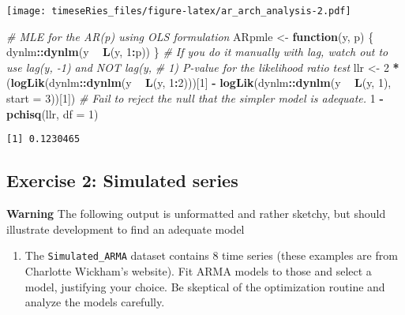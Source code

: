 \documentclass[]{book}
\newenvironment{Shaded}{\begin{snugshade}}{\end{snugshade}}
\newcommand{\CommentTok}[1]{\textcolor[rgb]{0.56,0.35,0.01}{\textit{#1}}}
\newcommand{\ControlFlowTok}[1]{\textcolor[rgb]{0.13,0.29,0.53}{\textbf{#1}}}
\newcommand{\DataTypeTok}[1]{\textcolor[rgb]{0.13,0.29,0.53}{#1}}
\newcommand{\DecValTok}[1]{\textcolor[rgb]{0.00,0.00,0.81}{#1}}
\newcommand{\KeywordTok}[1]{\textcolor[rgb]{0.13,0.29,0.53}{\textbf{#1}}}
\newcommand{\NormalTok}[1]{#1}
\newcommand{\OperatorTok}[1]{\textcolor[rgb]{0.81,0.36,0.00}{\textbf{#1}}}
\newcommand{\StringTok}[1]{\textcolor[rgb]{0.31,0.60,0.02}{#1}}
\providecommand{\tightlist}{%
  \setlength{\itemsep}{0pt}\setlength{\parskip}{0pt}}
\begin{document}
\texttt{[image: timeseRies\_files/figure-latex/ar\_arch\_analysis-2.pdf]}

\begin{Shaded}
\begin{Highlighting}[]
\CommentTok{# MLE for the AR(p) using OLS formulation}
\NormalTok{ARpmle <-}\StringTok{ }\ControlFlowTok{function}\NormalTok{(y, p) \{}
\NormalTok{    dynlm}\OperatorTok{::}\KeywordTok{dynlm}\NormalTok{(y }\OperatorTok{~}\StringTok{ }\KeywordTok{L}\NormalTok{(y, }\DecValTok{1}\OperatorTok{:}\NormalTok{p))}
\NormalTok{\}}
\CommentTok{# If you do it manually with lag, watch out to use lag(y, -1) and NOT lag(y,}
\CommentTok{# 1) P-value for the likelihood ratio test}
\NormalTok{llr <-}\StringTok{ }\DecValTok{2} \OperatorTok{*}\StringTok{ }\NormalTok{(}\KeywordTok{logLik}\NormalTok{(dynlm}\OperatorTok{::}\KeywordTok{dynlm}\NormalTok{(y }\OperatorTok{~}\StringTok{ }\KeywordTok{L}\NormalTok{(y, }\DecValTok{1}\OperatorTok{:}\DecValTok{2}\NormalTok{)))[}\DecValTok{1}\NormalTok{] }\OperatorTok{-}\StringTok{ }\KeywordTok{logLik}\NormalTok{(dynlm}\OperatorTok{::}\KeywordTok{dynlm}\NormalTok{(y }\OperatorTok{~}\StringTok{ }
\StringTok{    }\KeywordTok{L}\NormalTok{(y, }\DecValTok{1}\NormalTok{), }\DataTypeTok{start =} \DecValTok{3}\NormalTok{))[}\DecValTok{1}\NormalTok{])}
\CommentTok{# Fail to reject the null that the simpler model is adequate.}
\DecValTok{1} \OperatorTok{-}\StringTok{ }\KeywordTok{pchisq}\NormalTok{(llr, }\DataTypeTok{df =} \DecValTok{1}\NormalTok{)}
\end{Highlighting}
\end{Shaded}

\begin{verbatim}
[1] 0.1230465
\end{verbatim}

\hypertarget{exercise-2-simulated-series-1}{%
\subsection{Exercise 2: Simulated
series}\label{exercise-2-simulated-series-1}}

\textbf{Warning} The following output is unformatted and rather sketchy,
but should illustrate development to find an adequate model

\begin{enumerate}
\def\labelenumi{\arabic{enumi}.}
\tightlist
\item
  The \texttt{Simulated\_ARMA} dataset contains 8 time series (these
  examples are from Charlotte Wickham's website). Fit ARMA models to
  those and select a model, justifying your choice. Be skeptical of the
  optimization routine and analyze the models carefully.
\end{enumerate}
\end{document}
